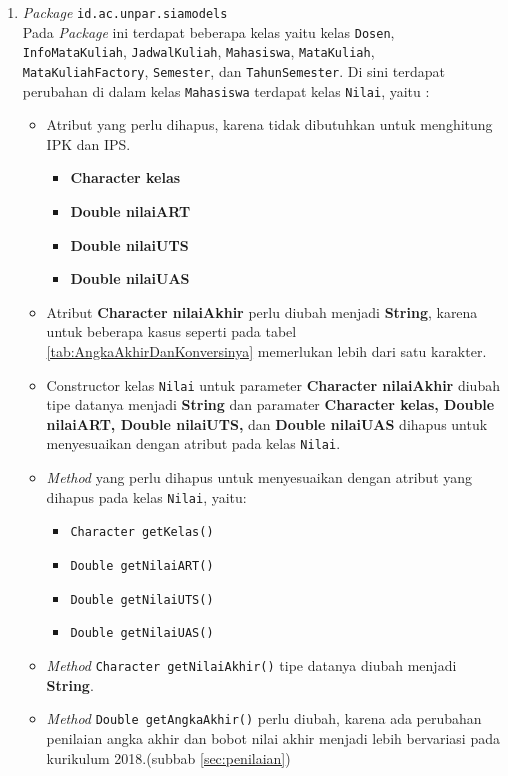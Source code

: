 \begin{enumerate}
	\item \textit{Package} \texttt{id.ac.unpar.siamodels}\\
	Pada \textit{Package} ini terdapat beberapa kelas yaitu kelas \texttt{Dosen}, \texttt{InfoMataKuliah}, \texttt{JadwalKuliah}, \texttt{Mahasiswa}, \texttt{MataKuliah}, \texttt{MataKuliahFactory}, \texttt{Semester}, dan \texttt{TahunSemester}. Di sini terdapat perubahan di dalam kelas \texttt{Mahasiswa} terdapat kelas \texttt{Nilai}, yaitu :
	\begin{itemize}
		\item Atribut yang perlu dihapus, karena tidak dibutuhkan untuk menghitung IPK dan IPS.
		\begin{itemize}
			\item \textbf{Character kelas}
			\item \textbf{Double nilaiART}
			\item \textbf{Double nilaiUTS}
			\item \textbf{Double nilaiUAS}
		\end{itemize}
		\item Atribut \textbf{Character nilaiAkhir} perlu diubah menjadi \textbf{String}, karena untuk beberapa kasus seperti pada tabel \ref{tab:AngkaAkhirDanKonversinya} memerlukan lebih dari satu karakter.
		\item Constructor kelas \texttt{Nilai} untuk parameter \textbf{Character nilaiAkhir} diubah tipe datanya menjadi \textbf{String} dan paramater \textbf{Character kelas, Double nilaiART, Double nilaiUTS,} dan \textbf{Double nilaiUAS} dihapus untuk menyesuaikan dengan atribut pada kelas \texttt{Nilai}.
		\item \textit{Method} yang perlu dihapus untuk menyesuaikan dengan atribut yang dihapus pada kelas \texttt{Nilai}, yaitu:
		\begin{itemize}
			\item \texttt{Character getKelas()}
			\item \texttt{Double getNilaiART()}
			\item \texttt{Double getNilaiUTS()}
			\item \texttt{Double getNilaiUAS()}
		\end{itemize}
		\item \textit{Method} \texttt{Character getNilaiAkhir()} tipe datanya diubah menjadi \textbf{String}.
		\item \textit{Method} \texttt{Double getAngkaAkhir()} perlu diubah, karena ada perubahan penilaian angka akhir dan bobot nilai akhir menjadi lebih bervariasi pada kurikulum 2018.(subbab \ref{sec:penilaian}) 

\end{itemize}
\end{enumerate}
